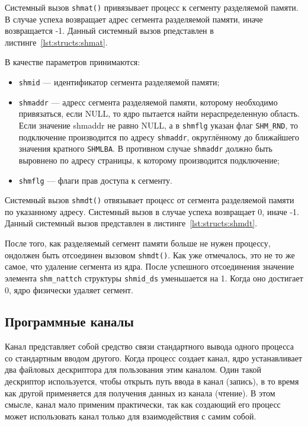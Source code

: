 Системный вызов \texttt{shmat()} привязывает процесс к сегменту разделяемой памяти. В случае успеха возвращает адрес сегмента разделяемой памяти, иначе возвращается -1.
Данный системный вызов рпедставлен в листинге~\ref{lst:structs:shmat}.



В качестве параметров принимаются:
\begin{itemize}
	\item \texttt{shmid} --- идентификатор сегмента разделяемой памяти;
	\item \texttt{shmaddr} --- адресс сегмента разделяемой памяти, которому необходимо привязаться, если NULL, то ядро пытается найти
	нераспределенную область. Если значение shmaddr не равно NULL, а в \texttt{shmflg} указан флаг \texttt{SHM\_RND}, то
	подключение производится по адресу \texttt{shmaddr}, округлённому до ближайшего значения кратного \texttt{SHMLBA}.
	В противном случае \texttt{shmaddr} должно быть выровнено по адресу страницы, к которому производится подключение;
	\item \texttt{shmflg} --- флаги прав доступа к сегменту.
\end{itemize}

Системный вызов \texttt{shmdt()} отвязывает процесс от сегмента разделяемой памяти по указанному адресу. Системный вызов в случае успеха возвращает 0, иначе -1. Данный системный вызов представлен в листинге~\ref{lst:structs:shmdt}.



После того, как разделяемый сегмент памяти больше не нужен процессу, ондолжен быть отсоединен вызовом \texttt{shmdt()}. Как уже отмечалось, это не то же самое, что удаление сегмента из ядра. После успешного отсоединения значение
элемента \texttt{shm\_nattch} структуры \texttt{shmid\_ds} уменьшается на 1. Когда оно достигает 0, ядро физически удаляет сегмент.

\subsection{Программные каналы}

Канал представляет собой средство связи стандартного вывода одного процесса со стандартным вводом другого. 
Когда процесс создает канал, ядро устанавливает два файловых дескриптора для пользования этим каналом. Один такой дескриптор используется, чтобы открыть путь ввода в канал (запись), в то время как другой применяется для получения данных из канала (чтение). В этом смысле, канал мало применим практически, так как создающий его процесс может использовать канал только для взаимодействия с самим собой.

